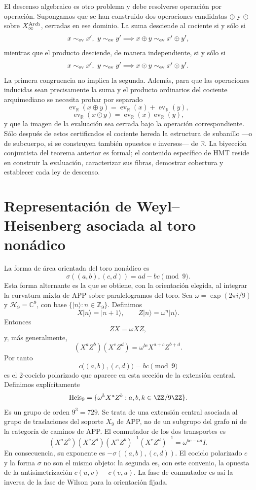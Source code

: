 El descenso algebraico es otro problema y debe resolverse operación por
operación. Supongamos que se han construido dos operaciones candidatas
\(\oplus\) y \(\odot\) sobre \(X_\infty^{\rm Arch}\), cerradas en ese
dominio. La suma desciende al cociente si y sólo si
\[
x\sim_{\rm ev}x',\ y\sim_{\rm ev}y'
\Longrightarrow
x\oplus y\sim_{\rm ev}x'\oplus y',
\]
mientras que el producto desciende, de manera independiente, si y sólo si
\[
x\sim_{\rm ev}x',\ y\sim_{\rm ev}y'
\Longrightarrow
x\odot y\sim_{\rm ev}x'\odot y'.
\]
La primera congruencia no implica la segunda. Además, para que las operaciones
inducidas sean precisamente la suma y el producto ordinarios del cociente
arquimediano se necesita probar por separado
\[
\operatorname{ev}_{\mathbb R}(x\oplus y)
=\operatorname{ev}_{\mathbb R}(x)+\operatorname{ev}_{\mathbb R}(y),
\]
\[
\operatorname{ev}_{\mathbb R}(x\odot y)
=\operatorname{ev}_{\mathbb R}(x)\operatorname{ev}_{\mathbb R}(y),
\]
y que la imagen de la evaluación sea cerrada bajo la operación correspondiente.
Sólo después de estos certificados el cociente hereda la estructura de
subanillo ---o de subcuerpo, si se construyen también opuestos e inversos---
de \(\mathbb R\). La biyección conjuntista del teorema anterior es formal;
el contenido específico de HMT reside en construir la evaluación, caracterizar sus
fibras, demostrar cobertura y establecer cada ley de descenso.

\section{Representación de Weyl--Heisenberg asociada al toro nonádico}

La forma de área orientada del toro nonádico es
\[
\sigma((a,b),(c,d))=ad-bc\pmod9.
\]
Esta forma alternante es la que se obtiene, con la orientación elegida, al
integrar la curvatura mixta de APP sobre paralelogramos del toro. Sea
\(\omega=\exp(2\pi i/9)\) y
\(\mathcal H_9=\mathbb C^9\), con base \(\{|n\rangle:n\in\mathbb Z_9\}\).
Definimos
\[
X|n\rangle=|n+1\rangle,
\qquad
Z|n\rangle=\omega^n|n\rangle.
\]
Entonces
\[
ZX=\omega XZ,
\]
y, más generalmente,
\[
(X^aZ^b)(X^cZ^d)
=\omega^{bc}X^{a+c}Z^{b+d}.
\]
Por tanto
\[
 c\bigl((a,b),(c,d)\bigr)=bc\pmod9
\]
es el \(2\)-cociclo polarizado que aparece en esta sección de la extensión
central. Definimos explícitamente
\[
 \operatorname{Heis}_9
 =\{\omega^kX^aZ^b:a,b,k\in\ZZ/9\ZZ\}.
\]
Es un grupo de orden \(9^3=729\). Se trata de una extensión central asociada
al grupo de traslaciones del soporte \(X_9\) de APP, no de un subgrupo del
grafo ni de la categoría de caminos de APP\@.
El conmutador de los dos transportes es
\[
(X^aZ^b)(X^cZ^d)(X^aZ^b)^{-1}(X^cZ^d)^{-1}
=\omega^{bc-ad}I.
\]
En consecuencia, su exponente es \(-\sigma((a,b),(c,d))\). El cociclo
polarizado \(c\) y la forma \(\sigma\) no son el mismo objeto: la segunda es,
con este convenio, la opuesta de la antisimetrización
\(c(u,v)-c(v,u)\). La fase de conmutador es así la inversa de la fase de
Wilson para la orientación fijada.

